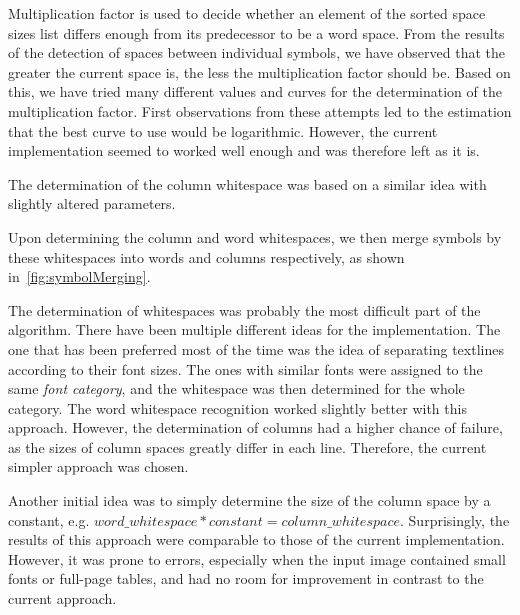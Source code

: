 Multiplication factor is used to decide whether an element of the sorted space sizes list differs enough from its predecessor to be a word space. From the results of the detection of spaces between individual symbols, we have observed that the greater the current space is, the less the multiplication factor should be. Based on this, we have tried many different values and curves for the determination of the multiplication factor. First observations from these attempts led to the estimation that the best curve to use would be logarithmic. However, the current implementation seemed to worked well enough and was therefore left as it is.

The determination of the column whitespace was based on a similar idea with slightly altered parameters.

Upon determining the column and word whitespaces, we then merge symbols by these whitespaces into words and columns respectively, as shown in~\cref{fig:symbolMerging}.

The determination of whitespaces was probably the most difficult part of the algorithm. There have been multiple different ideas for the implementation. The one that has been preferred most of the time was the idea of separating textlines according to their font sizes. The ones with similar fonts were assigned to the same \emph{font category}, and the whitespace was then determined for the whole category. The word whitespace recognition worked slightly better with this approach. However, the determination of columns had a higher chance of failure, as the sizes of column spaces greatly differ in each line. Therefore, the current simpler approach was chosen.

Another initial idea was to simply determine the size of the column space by a constant, e.g. $word\_whitespace*constant = column\_whitespace$. Surprisingly, the results of this approach were comparable to those of the current implementation. However, it was prone to errors, especially when the input image contained small fonts or full-page tables, and had no room for improvement in contrast to the current approach.


